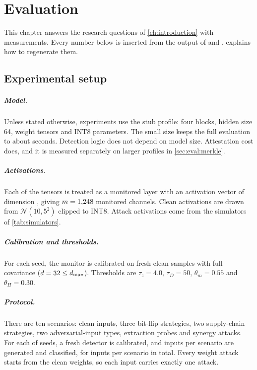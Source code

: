 \chapter{Evaluation}
\label{ch:evaluation}

This chapter answers the research questions of \cref{ch:introduction} with measurements. Every
number below is inserted from the output of  and
.  explains how to regenerate them.

\section{Experimental setup}
\label{sec:eval:setup}

\paragraph{Model.} Unless stated otherwise, experiments use the  stub profile: four
blocks, hidden size 64, \TinyLayers{} weight tensors and \TinyParams{} INT8 parameters. The
small size keeps the full evaluation to about \WallTime{} seconds. Detection logic does not
depend on model size. Attestation cost does, and it is measured separately on larger profiles in
\cref{sec:eval:merkle}.

\paragraph{Activations.} Each of the \TinyLayers{} tensors is treated as a monitored layer with
an activation vector of dimension \ActDim{}, giving $m=1{,}248$ monitored channels. Clean
activations are drawn from $\mathcal{N}(10,5^2)$ clipped to INT8. Attack activations come from the
simulators of \cref{tab:simulators}.

\paragraph{Calibration and thresholds.} For each seed, the monitor is calibrated on \NCalib{}
fresh clean samples with full covariance ($d=32\le d_{\max}$). Thresholds are $\tau_z=4.0$,
$\tau_D=50$, $\theta_m=0.55$ and $\theta_H=0.30$.

\paragraph{Protocol.} There are ten scenarios: clean inputs, three bit-flip strategies, two
supply-chain strategies, two adversarial-input types, extraction probes and synergy attacks. For
each of \NSeeds{} seeds, a fresh detector is calibrated, and \NPerSeed{} inputs per scenario are
generated and classified, for \NPerScenario{} inputs per scenario in total. Every weight attack
starts from the clean weights, so each input carries exactly one attack.

